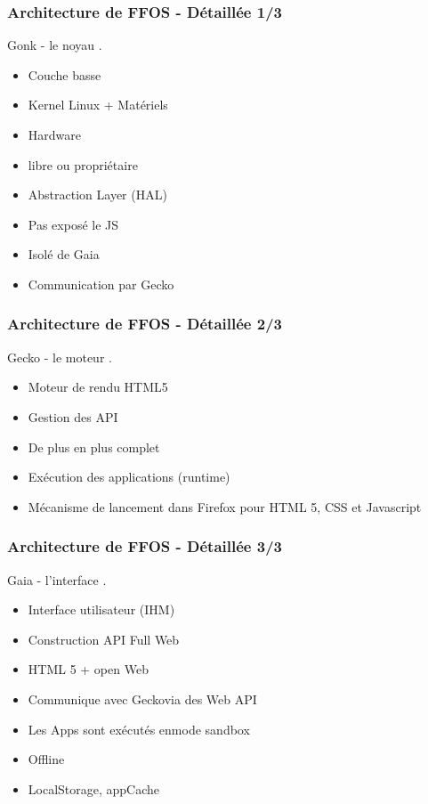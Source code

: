\documentclass{beamer}
\begin{document}
\begin{frame}
\frametitle{Architecture de FFOS - Détaillée 1/3}
\begin{block}{Gonk - le noyau}
.
\begin{itemize}
\item Couche basse
\item Kernel Linux + Matériels
\item Hardware
\item libre ou propriétaire
\item Abstraction Layer (HAL)
\item Pas exposé le JS
\item Isolé de Gaia
\item Communication par Gecko
\end{itemize}
\end{block}
\end{frame}

\begin{frame}
\frametitle{Architecture de FFOS - Détaillée 2/3}
\begin{block}{Gecko - le moteur}
.
\begin{itemize}
\item Moteur de rendu HTML5
\item Gestion des API
\item De plus en plus complet
\item Exécution des applications (runtime)
\item Mécanisme de lancement dans Firefox pour HTML 5, CSS et Javascript
\end{itemize}
\end{block}
\end{frame}

\begin{frame}
\frametitle{Architecture de FFOS - Détaillée 3/3}
\begin{block}{Gaia - l'interface}
.
\begin{itemize}
\item Interface utilisateur (IHM)
\item Construction API Full Web
\item HTML 5 + open Web
\item Communique avec Geckovia des Web API
\item Les Apps sont exécutés enmode sandbox
\item Offline
\item LocalStorage, appCache
\end{itemize}
\end{block}
\end{frame}
\end{document}
